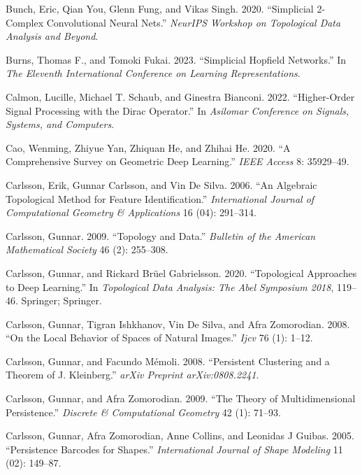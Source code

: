 \documentclass[
  12pt,
]{krantz}
\newlength{\cslhangindent}
\newenvironment{CSLReferences}[2] %
 {\begin{list}{}{%
  \setlength{\itemindent}{0pt}
  \setlength{\leftmargin}{0pt}
  \setlength{\parsep}{0pt}
  \ifodd #1
   \setlength{\leftmargin}{\cslhangindent}
   \setlength{\itemindent}{-1\cslhangindent}
  \fi
  \setlength{\itemsep}{#2\baselineskip}}}
 {\end{list}}
\begin{document}
\begin{CSLReferences}{1}{0}
Bunch, Eric, Qian You, Glenn Fung, and Vikas Singh. 2020. {``Simplicial
2-Complex Convolutional Neural Nets.''} \emph{NeurIPS Workshop on
Topological Data Analysis and Beyond}.

Burns, Thomas F., and Tomoki Fukai. 2023. {``Simplicial {H}opfield
Networks.''} In \emph{The Eleventh International Conference on Learning
Representations}.

Calmon, Lucille, Michael T. Schaub, and Ginestra Bianconi. 2022.
{``Higher-Order Signal Processing with the {D}irac Operator.''} In
\emph{Asilomar Conference on Signals, Systems, and Computers}.

Cao, Wenming, Zhiyue Yan, Zhiquan He, and Zhihai He. 2020. {``A
Comprehensive Survey on Geometric Deep Learning.''} \emph{IEEE Access}
8: 35929--49.

Carlsson, Erik, Gunnar Carlsson, and Vin De Silva. 2006. {``An Algebraic
Topological Method for Feature Identification.''} \emph{International
Journal of Computational Geometry \& Applications} 16 (04): 291--314.

Carlsson, Gunnar. 2009. {``Topology and Data.''} \emph{Bulletin of the
American Mathematical Society} 46 (2): 255--308.

Carlsson, Gunnar, and Rickard Brüel Gabrielsson. 2020. {``Topological
Approaches to Deep Learning.''} In \emph{Topological Data Analysis: The
Abel Symposium 2018}, 119--46. Springer; Springer.

Carlsson, Gunnar, Tigran Ishkhanov, Vin De Silva, and Afra Zomorodian.
2008. {``On the Local Behavior of Spaces of Natural Images.''}
\emph{Ijcv} 76 (1): 1--12.

Carlsson, Gunnar, and Facundo Mémoli. 2008. {``Persistent Clustering and
a Theorem of {J. K}leinberg.''} \emph{arXiv Preprint arXiv:0808.2241}.

Carlsson, Gunnar, and Afra Zomorodian. 2009. {``The Theory of
Multidimensional Persistence.''} \emph{Discrete \& Computational
Geometry} 42 (1): 71--93.

Carlsson, Gunnar, Afra Zomorodian, Anne Collins, and Leonidas J Guibas.
2005. {``Persistence Barcodes for Shapes.''} \emph{International Journal
of Shape Modeling} 11 (02): 149--87.


\end{CSLReferences}
\end{document}
